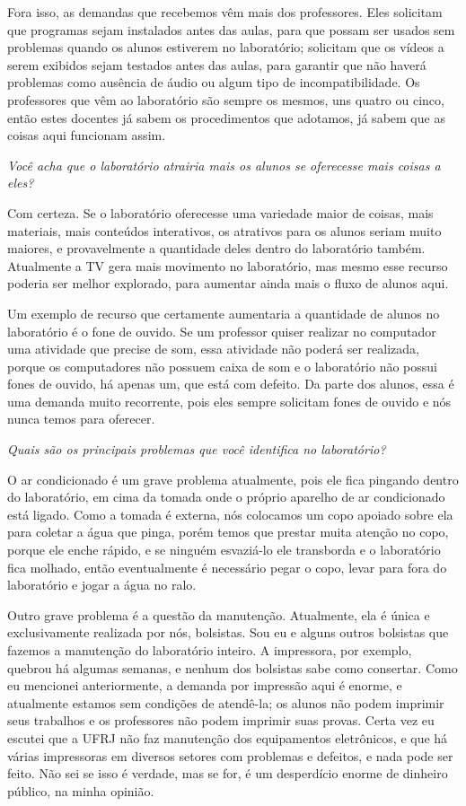 Fora isso, as demandas que recebemos vêm mais dos professores. Eles solicitam que programas sejam instalados antes das aulas, para que possam ser usados sem problemas quando os alunos estiverem no laboratório; solicitam que os vídeos a serem exibidos sejam testados antes das aulas, para garantir que não haverá problemas como ausência de áudio ou algum tipo de incompatibilidade. Os professores que vêm ao laboratório são sempre os mesmos, uns quatro ou cinco, então estes docentes já sabem os procedimentos que adotamos, já sabem que as coisas aqui funcionam assim.

\textit{Você acha que o laboratório atrairia mais os alunos se oferecesse mais coisas a eles?}

Com certeza. Se o laboratório oferecesse uma variedade maior de coisas, mais materiais, mais conteúdos interativos, os atrativos para os alunos seriam muito maiores, e provavelmente a quantidade deles dentro do laboratório também. Atualmente a TV gera mais movimento no laboratório, mas mesmo esse recurso poderia ser melhor explorado, para aumentar ainda mais o fluxo de alunos aqui.

Um exemplo de recurso que certamente aumentaria a quantidade de alunos no laboratório é o fone de ouvido. Se um professor quiser realizar no computador uma atividade que precise de som, essa atividade não poderá ser realizada, porque os computadores não possuem caixa de som e o laboratório não possui fones de ouvido, há apenas um, que está com defeito. Da parte dos alunos, essa é uma demanda muito recorrente, pois eles sempre solicitam fones de ouvido e nós nunca temos para oferecer.

\textit{Quais são os principais problemas que você identifica no laboratório?}

O ar condicionado é um grave problema atualmente, pois ele fica pingando dentro do laboratório, em cima da tomada onde o próprio aparelho de ar condicionado está ligado. Como a tomada é externa, nós colocamos um copo apoiado sobre ela para coletar a água que pinga, porém temos que prestar muita atenção no copo, porque ele enche rápido, e se ninguém esvaziá-lo ele transborda e o laboratório fica molhado, então eventualmente é necessário pegar o copo, levar para fora do laboratório e jogar a água no ralo.

Outro grave problema é a questão da manutenção. Atualmente, ela é única e exclusivamente realizada por nós, bolsistas. Sou eu e alguns outros bolsistas que fazemos a manutenção do laboratório inteiro. A impressora, por exemplo, quebrou há algumas semanas, e nenhum dos bolsistas sabe como consertar. Como eu mencionei anteriormente, a demanda por impressão aqui é enorme, e atualmente estamos sem condições de atendê-la; os alunos não podem imprimir seus trabalhos e os professores não podem imprimir suas provas. Certa vez eu escutei que a UFRJ não faz manutenção dos equipamentos eletrônicos, e que há várias impressoras em diversos setores com problemas e defeitos, e nada pode ser feito. Não sei se isso é verdade, mas se for, é um desperdício enorme de dinheiro público, na minha opinião.

